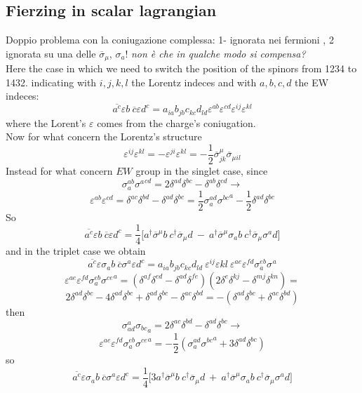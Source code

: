 \documentclass{article}
\begin{document}
\subsection{Fierzing in scalar lagrangian}
Doppio problema con la coniugazione complessa: 1- ignorata nei fermioni , 2 ignorata su una delle $\overline{\sigma}_\mu$, $\sigma_a$! \emph{non è che in qualche modo si compensa?} \\
Here the case in which we need to switch the position of the spinors from 1234 to 1432.
indicating with $i,j,k,l$ the Lorentz indeces and with $a,b,c,d$ the EW indeces: 
\[
\overline{a^c} \varepsilon b \  \overline{c} \varepsilon d^c = a_{ia} b_{jb} c_{kc} d_{ld} \varepsilon^{ab} \varepsilon^{cd} \varepsilon^{ij} \varepsilon^{kl}
\]
where the Lorent's $\varepsilon$ comes from the charge's coniugation.\\
Now for what concern the Lorentz's structure
\[
\varepsilon^{ij} \varepsilon^{kl} = - \varepsilon^{ji} \varepsilon^{kl} = -\frac{1}{2} \overline{\sigma}^\mu_{jk} \overline{\sigma}_{\mu il} 
\]
Instead for what concern $EW$ group in the singlet case, since 
\[
\sigma_a^{ab} {\sigma^a}^{cd} =2 \delta^{ad} \delta^{bc} - \delta^{ab} \delta^{cd} \rightarrow
\]
\[
\varepsilon^{ab} \varepsilon^{cd} = \delta^{ac} \delta^{bd} - \delta^{ad} \delta^{bc} = \frac{1}{2} \sigma^{ad}_a {\sigma^{bc}}^a - \frac{1}{2}\delta^{ad}\delta^{bc}
\]
So 
\[
\overline{a^c} \varepsilon b \  \overline{c} \varepsilon d^c =\frac{1}{4}\big[ a^\dagger \overline{\sigma}^ \mu b \ c^\dagger \overline{\sigma}_\mu d \ - \ a^\dagger \overline{\sigma}^\mu  \sigma_a b \ c^\dagger \overline{\sigma}_\mu  \sigma^a d \big] 
\]
and in the triplet case we obtain
\[
\overline{a^c} \varepsilon \sigma_a b \  \overline{c} \sigma^a \varepsilon  d^c = a_{ia} b_{jb} c_{kc} d_{ld} \ \varepsilon^{ij} \varepsilon{kl} \ \varepsilon^{ae} \varepsilon^{fd} \sigma^{eb}_a {\sigma^{}}^a 
\]
\[
\varepsilon^{ae} \varepsilon^{fd} \sigma^{eb}_a {\sigma^{ce}}^a =(\delta^{af}\delta^{ed} - \delta^{ad}\delta^{fe})(2\delta^{e}\delta^{kj} - \delta^{mj}\delta^{kn})=
\]
\[
2\delta^{ad}\delta^{bc} -4\delta^{ad}\delta^{bc} + \delta^{ad}\delta^{bc} -\delta^{ac}\delta^{bd}= -(\delta^{ad}\delta^{bc}+\delta^{ac}\delta^{bd})
\]
then
\[
\sigma^a_{ad}{\sigma_{bc}}_a= 2\delta^{ac}\delta^{bd}-\delta^{ad}\delta^{bc}\rightarrow
\]
\[
\varepsilon^{ae} \varepsilon^{fd} \sigma^{eb}_a {\sigma^{ce}}^a =-\frac{1}{2}(\sigma_a^{ad}{\sigma^{bc}}^a + 3 \delta^{ad}\delta^{bc})
\]
so
\[
\overline{a^c} \varepsilon \sigma_a b \  \overline{c} \sigma^a \varepsilon  d^c= \frac{1}{4}\big[3 a^\dagger \overline{\sigma}^ \mu b \ c^\dagger \overline{\sigma}_\mu d \ + \ a^\dagger \overline{\sigma}^\mu  \sigma_a b \ c^\dagger \overline{\sigma}_\mu  \sigma^a d \big] 
\]
\end{document}
